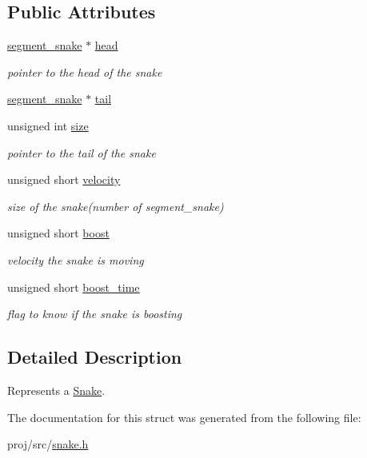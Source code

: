 \subsection*{Public Attributes}
\begin{DoxyCompactItemize}
\item 
\hyperlink{group__snake_ga40f634d31a1f9372bd182d65da207a21}{segment\+\_\+snake} $\ast$ \hyperlink{group__snake_gaf63e50ac65f365d67ae3975a178cba8c}{head}
\begin{DoxyCompactList}\small\item\em pointer to the head of the snake \end{DoxyCompactList}\item 
\hyperlink{group__snake_ga40f634d31a1f9372bd182d65da207a21}{segment\+\_\+snake} $\ast$ \hyperlink{group__snake_gada92e10f60af5b1afdb7318df07a1a33}{tail}
\item 
unsigned int \hyperlink{group__snake_ga29ba822024f7651a9fa0c80df840252b}{size}
\begin{DoxyCompactList}\small\item\em pointer to the tail of the snake \end{DoxyCompactList}\item 
unsigned short \hyperlink{group__snake_gac444a5a9306233f5be0b603335785b3d}{velocity}
\begin{DoxyCompactList}\small\item\em size of the snake(number of segment\+\_\+snake) \end{DoxyCompactList}\item 
unsigned short \hyperlink{group__snake_ga7339bbc2027ffeb1ce00f24a834610cc}{boost}
\begin{DoxyCompactList}\small\item\em velocity the snake is moving \end{DoxyCompactList}\item 
unsigned short \hyperlink{group__snake_ga0b46bc6b402fd8999c6998eca1806c3e}{boost\+\_\+time}
\begin{DoxyCompactList}\small\item\em flag to know if the snake is boosting \end{DoxyCompactList}\end{DoxyCompactItemize}


\subsection{Detailed Description}
Represents a \hyperlink{structSnake}{Snake}. 

The documentation for this struct was generated from the following file\+:\begin{DoxyCompactItemize}
\item 
proj/src/\hyperlink{snake_8h}{snake.\+h}\end{DoxyCompactItemize}

